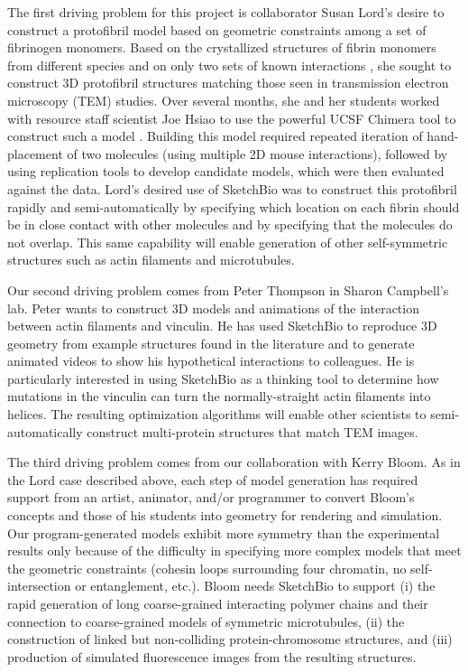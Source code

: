 \documentclass[twocolumn]{bmcart}%
\begin{document}
The first driving problem for this project is collaborator Susan Lord's desire to construct a protofibril model based on geometric constraints among a set of fibrinogen monomers.
Based on the crystallized structures of fibrin monomers from different species and on only two sets of known interactions \cite{lord2007fibrinogen}, she sought to construct 3D protofibril structures matching those seen in transmission electron microscopy (TEM) studies.
Over several months, she and her students worked with resource staff scientist Joe Hsiao to use the powerful UCSF Chimera tool to construct such a model \cite{lordSubmitted}.
Building this model required repeated iteration of hand-placement of two molecules (using multiple 2D mouse interactions), followed by using replication tools to develop candidate models, which were then evaluated against the data.
Lord's desired use of SketchBio was to construct this protofibril rapidly and semi-automatically by specifying which location on each fibrin should be in close contact with other molecules and by specifying that the molecules do not overlap.
This same capability will enable generation of other self-symmetric structures such as actin filaments and microtubules.

Our second driving problem comes from Peter Thompson in Sharon Campbell's lab.
Peter wants to construct 3D models and animations of the interaction between actin filaments and vinculin.
He has used SketchBio to reproduce 3D geometry from example structures found in the literature and to generate animated videos to show his hypothetical interactions to colleagues.
He is particularly interested in using SketchBio as a thinking tool to determine how mutations in the vinculin can turn the normally-straight actin filaments into helices.
The resulting optimization algorithms will enable other scientists to semi-automatically construct multi-protein structures that match TEM images.

The third driving problem comes from our collaboration with Kerry Bloom.
As in the Lord case described above, each step of model generation has required support from an artist, animator, and/or programmer to convert Bloom's concepts and those of his students into geometry for rendering and simulation.
Our program-generated models exhibit more symmetry than the experimental results only because of the difficulty in specifying more complex models that meet the geometric constraints (cohesin loops surrounding four chromatin, no self-intersection or entanglement, etc.).
Bloom needs SketchBio to support (i) the rapid generation of long coarse-grained interacting polymer chains and their connection to coarse-grained models of symmetric microtubules, (ii) the construction of linked but non-colliding protein-chromosome structures, and (iii) production of simulated fluorescence images from the resulting structures.
\end{document}
